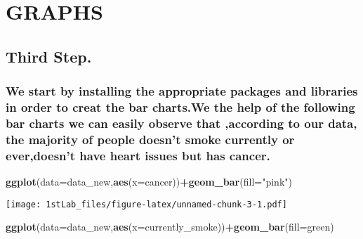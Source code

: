 \documentclass[
]{article}
\newenvironment{Shaded}{\begin{snugshade}}{\end{snugshade}}
\newcommand{\AttributeTok}[1]{\textcolor[rgb]{0.13,0.29,0.53}{#1}}
\newcommand{\FunctionTok}[1]{\textcolor[rgb]{0.13,0.29,0.53}{\textbf{#1}}}
\newcommand{\NormalTok}[1]{#1}
\newcommand{\SpecialCharTok}[1]{\textcolor[rgb]{0.81,0.36,0.00}{\textbf{#1}}}
\newcommand{\StringTok}[1]{\textcolor[rgb]{0.31,0.60,0.02}{#1}}
\begin{document}
\hypertarget{graphs}{%
\section{\texorpdfstring{\textbf{GRAPHS}}{GRAPHS}}\label{graphs}}

\hypertarget{third-step.}{%
\subsection{Third Step.}\label{third-step.}}

\hypertarget{we-start-by-installing-the-appropriate-packages-and-libraries-in-order-to-creat-the-bar-charts.we-the-help-of-the-following-bar-charts-we-can-easily-observe-that-according-to-our-data-the-majority-of-people-doesnt-smoke-currently-or-everdoesnt-have-heart-issues-but-has-cancer.}{%
\subsubsection{We start by installing the appropriate packages and
libraries in order to creat the bar charts.We the help of the following
bar charts we can easily observe that ,according to our data, the
majority of people doesn't smoke currently or ever,doesn't have heart
issues but has
cancer.}\label{we-start-by-installing-the-appropriate-packages-and-libraries-in-order-to-creat-the-bar-charts.we-the-help-of-the-following-bar-charts-we-can-easily-observe-that-according-to-our-data-the-majority-of-people-doesnt-smoke-currently-or-everdoesnt-have-heart-issues-but-has-cancer.}}

\begin{Shaded}
\begin{Highlighting}[]
\FunctionTok{ggplot}\NormalTok{(}\AttributeTok{data=}\NormalTok{data\_new,}\FunctionTok{aes}\NormalTok{(}\AttributeTok{x=}\NormalTok{cancer))}\SpecialCharTok{+}\FunctionTok{geom\_bar}\NormalTok{(}\AttributeTok{fill=}\StringTok{"pink"}\NormalTok{)}
\end{Highlighting}
\end{Shaded}

\texttt{[image: 1stLab\_files/figure-latex/unnamed-chunk-3-1.pdf]}

\begin{Shaded}
\begin{Highlighting}[]
\FunctionTok{ggplot}\NormalTok{(}\AttributeTok{data=}\NormalTok{data\_new,}\FunctionTok{aes}\NormalTok{(}\AttributeTok{x=}\NormalTok{currently\_smoke))}\SpecialCharTok{+}\FunctionTok{geom\_bar}\NormalTok{(}\AttributeTok{fill=}\StringTok{\textquotesingle{}green\textquotesingle{}}\NormalTok{)}
\end{Highlighting}
\end{Shaded}
\end{document}
